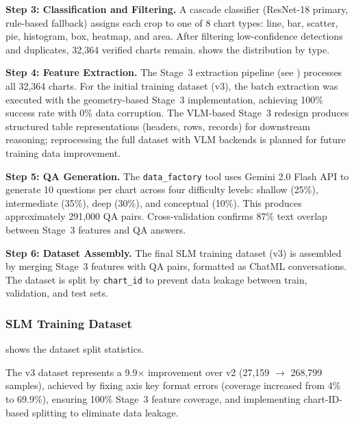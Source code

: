 \textbf{Step 3: Classification and Filtering.}
A cascade classifier (ResNet-18 primary, rule-based fallback) assigns each crop to one
of 8 chart types: line, bar, scatter, pie, histogram, box, heatmap, and area. After
filtering low-confidence detections and duplicates, 32,364 verified charts remain.
 shows the distribution by type.

\begin{table}[htbp]
\centering
\caption{Chart type distribution in the classified dataset (32,364 charts).}
\label{tab:chart_dist}

\end{table}

\textbf{Step 4: Feature Extraction.}
The Stage~3 extraction pipeline (see ) processes all 32,364 charts.
For the initial training dataset (v3), the batch extraction was executed with the geometry-based
Stage~3 implementation, achieving 100\% success rate with 0\% data corruption. The VLM-based
Stage~3 redesign produces structured table representations (headers, rows, records) for
downstream reasoning; reprocessing the full dataset with VLM backends is planned for
future training data improvement.

\textbf{Step 5: QA Generation.}
The \texttt{data\_factory} tool uses Gemini 2.0 Flash API to generate 10 questions per
chart across four difficulty levels: shallow (25\%), intermediate (35\%), deep (30\%),
and conceptual (10\%). This produces approximately 291,000 QA pairs. Cross-validation
confirms 87\% text overlap between Stage~3 features and QA answers.

\textbf{Step 6: Dataset Assembly.}
The final SLM training dataset (v3) is assembled by merging Stage~3 features with QA
pairs, formatted as ChatML conversations. The dataset is split by \texttt{chart\_id}
to prevent data leakage between train, validation, and test sets.

\subsubsection{SLM Training Dataset}

 shows the dataset split statistics.

\begin{table}[htbp]
\centering
\caption{SLM training dataset v3 split statistics.}
\label{tab:splits}

\end{table}

The v3 dataset represents a 9.9$\times$ improvement over v2 (27,159 $\to$ 268,799
samples), achieved by fixing axis key format errors (coverage increased from 4\%
to 69.9\%), ensuring 100\% Stage~3 feature coverage, and implementing chart-ID-based
splitting to eliminate data leakage.

